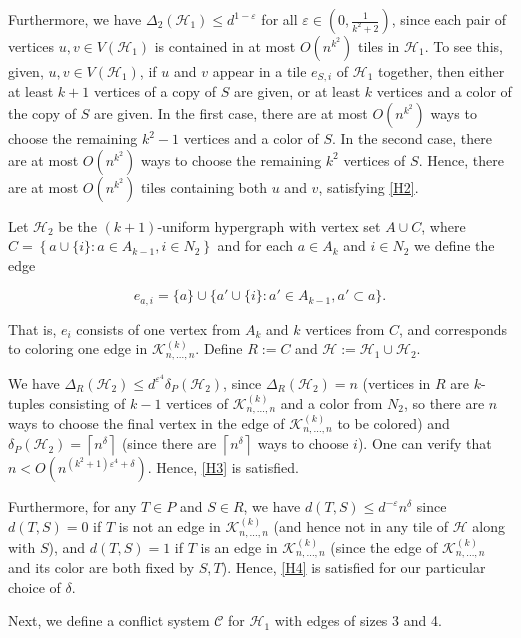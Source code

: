 \documentclass{article}
\theoremstyle{definition}
\newcommand\cH{{\mathcal H}}
\newcommand\cC{{\mathcal C}}
\newcommand\cK{{\mathcal K}}
\begin{document}
Furthermore, we have $\Delta_2(\cH_1) \leq d^{1-\varepsilon} $ for all $\varepsilon \in \left( 0,\frac{1}{k^2+2} \right)$, since each pair of vertices $u,v \in V(\cH_1)$ is contained in at most $O(n^{k^2})$ tiles in $\cH_1$.  To see this, given, $u,v \in V(\cH_1)$, if $u$ and $v$ appear in a tile $e_{S,i}$ of $\cH_1$ together, then either at least $k+1$ vertices of a copy of $S$ are given, or at least $k$ vertices and a color of the copy of $S$ are given.  In the first case, there are at most $O(n^{k^2})$ ways to choose the remaining $k^2 - 1$ vertices and a color of $S$.  In the second case, there are at most $O(n^{k^2})$ ways to choose the remaining $k^2$ vertices of $S$.  Hence, there are at most $O(n^{k^2})$ tiles containing both $u$ and $v$, satisfying \ref{H2}.  

Let $\cH_2$ be the $(k+1)$-uniform hypergraph with vertex set $A \cup C$, where $C= \left\{a\cup \{i\}: a\in A_{k-1}, i\in N_2 \right\}$ and for each $a\in A_k$ and $i\in N_2$ we define the edge





\[e_{a,i}=\{a\}\cup \{a'\cup \{i\}:a'\in A_{k-1}, a'\subset a\}.\]


That is, $e_{i}$ consists of one vertex from $A_k$ and $k$ vertices from $C$, and corresponds to coloring one edge in $\cK^{(k)}_{n, \dots, n}$.  Define $R := C$ and $\cH := \cH_1 \cup \cH_2$.  

We have $\Delta_R(\cH_2) \leq d^{\varepsilon^4} \delta_P(\cH_2)$, since $\Delta_R(\cH_2) = n$ (vertices in $R$ are $k$-tuples consisting of $k-1$ vertices of $\cK^{(k)}_{n, \dots,n}$ and a color from $N_2$, so there are $n$ ways to choose the final vertex in the edge of $\cK^{(k)}_{n, \dots,n}$ to be colored) and $\delta_P(\cH_2) = \left\lceil n^{\delta} \right\rceil$ (since there are $\left\lceil n^\delta \right \rceil$ ways to choose $i$).  One can verify that $n < O(n^{(k^2 + 1) \varepsilon^4 + \delta})$. Hence, \ref{H3} is satisfied.  

Furthermore, for any $T \in P$ and $S \in R$, we have $d(T,S) \leq d^{-\varepsilon} n^{\delta}$ since $d(T,S) = 0$ if $T$ is not an edge in $\cK^{(k)}_{n,\dots ,n}$ (and hence not in any tile of $\cH$ along with $S$), and $d(T,S) = 1$ if $T$ is an edge in $\cK^{(k)}_{n,\dots ,n}$ (since the edge of $\cK^{(k)}_{n, \dots ,n}$ and its color are both fixed by $S,T$).  Hence, \ref{H4} is satisfied for our particular choice of $\delta$.  

Next, we define a conflict system $\cC$ for $\cH_1$ with edges of sizes 3 and 4.
\end{document}
